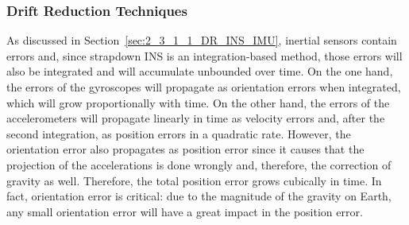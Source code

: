 \subsubsection{Drift Reduction Techniques}
\label{sec:2_3_1_3_DR_INS_ZUPT}
As discussed in Section~\ref{sec:2_3_1_1_DR_INS_IMU}, inertial sensors contain errors and, since strapdown INS is an integration-based method, those errors will also be integrated and will accumulate unbounded over time.
On the one hand, the errors of the gyroscopes will propagate as orientation errors when integrated, which will grow proportionally with time.
On the other hand, the errors of the accelerometers will propagate linearly in time as velocity errors and, after the second integration, as position errors in a quadratic rate.
However, the orientation error also propagates as position error since it causes that the projection of the accelerations is done wrongly and, therefore, the correction of gravity as well.
Therefore, the total position error grows cubically in time.
In fact, orientation error is critical: due to the magnitude of the gravity on Earth, any small orientation error will have a great impact in the position error.

